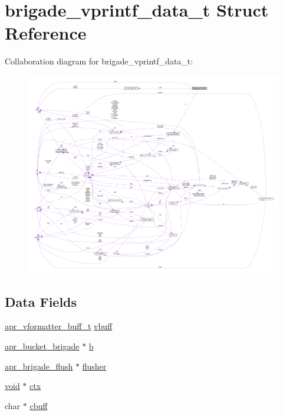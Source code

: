 \hypertarget{structbrigade__vprintf__data__t}{}\section{brigade\+\_\+vprintf\+\_\+data\+\_\+t Struct Reference}
\label{structbrigade__vprintf__data__t}


Collaboration diagram for brigade\+\_\+vprintf\+\_\+data\+\_\+t\+:
\nopagebreak
\begin{figure}[H]
\begin{center}
\leavevmode
\includegraphics[width=350pt]{structbrigade__vprintf__data__t__coll__graph}
\end{center}
\end{figure}
\subsection*{Data Fields}
\begin{DoxyCompactItemize}
\item 
\hyperlink{structapr__vformatter__buff__t}{apr\+\_\+vformatter\+\_\+buff\+\_\+t} \hyperlink{structbrigade__vprintf__data__t_af0fe10d53f605fc1ec7ddcfd2a41b5df}{vbuff}
\item 
\hyperlink{structapr__bucket__brigade}{apr\+\_\+bucket\+\_\+brigade} $\ast$ \hyperlink{structbrigade__vprintf__data__t_a3c486f90d42b709399db05a286ded50b}{b}
\item 
\hyperlink{group__APR__Util__Bucket__Brigades_gafa0dbcd060e2e432406052e4d7c96204}{apr\+\_\+brigade\+\_\+flush} $\ast$ \hyperlink{structbrigade__vprintf__data__t_a60e6a527f75988197bdbe57b95151571}{flusher}
\item 
\hyperlink{group__MOD__ISAPI_gacd6cdbf73df3d9eed42fa493d9b621a6}{void} $\ast$ \hyperlink{structbrigade__vprintf__data__t_adaa1655cc0c93a679dd1e6fe5b208981}{ctx}
\item 
char $\ast$ \hyperlink{structbrigade__vprintf__data__t_ae1386c43d1e8b3bbfbe662307cc590cb}{cbuff}
\end{DoxyCompactItemize}


